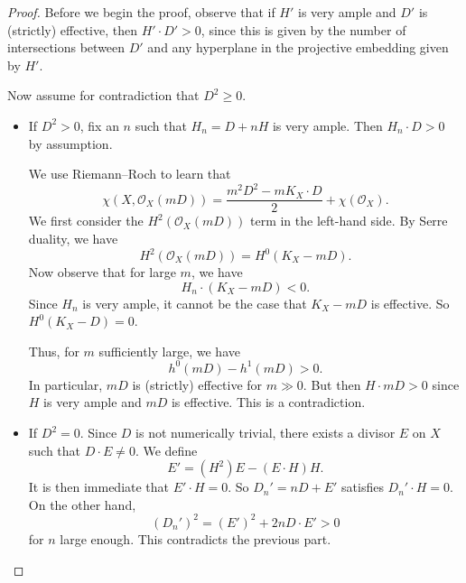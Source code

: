 \documentclass[a4paper]{article}
\newcommand\Pic{\mathrm{Pic}}
\begin{document}
\begin{proof}
  Before we begin the proof, observe that if $H'$ is very ample and $D'$ is (strictly) effective, then $H' \cdot D' > 0$, since this is given by the number of intersections between $D'$ and any hyperplane in the projective embedding given by $H'$.

  Now assume for contradiction that $D^2 \geq 0$.
  \begin{itemize}
    \item If $D^2 > 0$, fix an $n$ such that $H_n = D + nH$ is very ample. Then $H_n \cdot D > 0$ by assumption.

      We use Riemann--Roch to learn that
      \[
        \chi(X, \mathcal{O}_X(mD)) = \frac{m^2 D^2 - m K_X \cdot D}{2} + \chi(\mathcal{O}_X).
      \]
      We first consider the $H^2(\mathcal{O}_X(mD))$ term in the left-hand side. By Serre duality, we have
      \[
        H^2(\mathcal{O}_X(mD)) = H^0(K_X - mD).
      \]
      Now observe that for large $m$, we have
      \[
        H_n \cdot (K_X - mD) < 0.
      \]
      Since $H_n$ is very ample, it cannot be the case that $K_X - mD$ is effective. So $H^0(K_X - D) = 0$.

      Thus, for $m$ sufficiently large, we have
      \[
        h^0(mD) - h^1(mD) > 0.
      \]
      In particular, $mD$ is (strictly) effective for $m \gg 0$. But then $H \cdot mD > 0$ since $H$ is very ample and $mD$ is effective. This is a contradiction.

    \item If $D^2 = 0$. Since $D$ is not numerically trivial, there exists a divisor $E$ on $X$ such that $D \cdot E \not= 0$. We define
      \[
        E' = (H^2) E - (E \cdot H) H.
      \]
      It is then immediate that $E' \cdot H = 0$. So $D_n' = nD + E'$ satisfies $D_n' \cdot H = 0$. On the other hand,
      \[
        (D_n')^2 = (E')^2 + 2n D\cdot E' > 0
      \]
      for $n$ large enough. This contradicts the previous part.\qedhere
  \end{itemize}
\end{proof}

\end{document}
